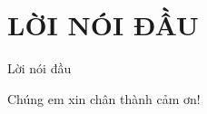 \section*{LỜI NÓI ĐẦU} %
\thispagestyle{empty}

Lời nói đầu

Chúng em xin chân thành cảm ơn! 



\cleardoublepage
